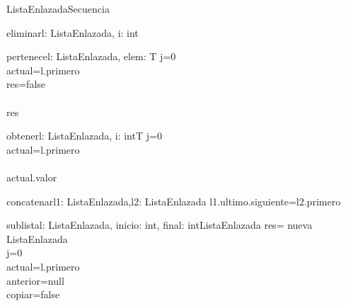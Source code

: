 \documentclass[a4paper,10pt]{article}
\begin{document}
\begin{design}{ListaEnlazada}{Secuencia}
\begin{impl}{eliminar}{\Inout l: ListaEnlazada, i: int}{}
    \end{impl}
    \begin{impl}{pertenece}{\In l: ListaEnlazada, \In elem: T}{\bool}
        j=0
        \\actual=l.primero
        \\res=false
        \\
        \\\return res
    \end{impl}
    \pagebreak
    \begin{impl}{obtener}{\In l: ListaEnlazada, \In i: int}{T}
        j=0
        \\actual=l.primero
        \\
        \\\return actual.valor
    \end{impl}
    \begin{impl}{concatenar}{\Inout l1: ListaEnlazada,\In l2: ListaEnlazada}{}
        l1.ultimo.siguiente=l2.primero
    \end{impl}
    \begin{impl}{sublista}{\In l: ListaEnlazada, \In inicio: int, \In final: int}{ListaEnlazada}
        res= nueva ListaEnlazada
        \\j=0
        \\actual=l.primero
        \\anterior=null
        \\copiar=false
    \end{impl}
\end{design}
\end{document}
